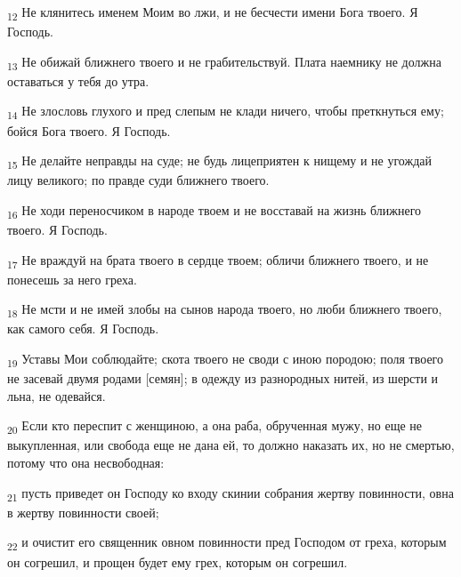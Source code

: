 \begin{tcolorbox}
\textsubscript{12} Не клянитесь именем Моим во лжи, и не бесчести имени Бога твоего. Я Господь.
\end{tcolorbox}
\begin{tcolorbox}
\textsubscript{13} Не обижай ближнего твоего и не грабительствуй. Плата наемнику не должна оставаться у тебя до утра.
\end{tcolorbox}
\begin{tcolorbox}
\textsubscript{14} Не злословь глухого и пред слепым не клади ничего, чтобы преткнуться ему; бойся Бога твоего. Я Господь.
\end{tcolorbox}
\begin{tcolorbox}
\textsubscript{15} Не делайте неправды на суде; не будь лицеприятен к нищему и не угождай лицу великого; по правде суди ближнего твоего.
\end{tcolorbox}
\begin{tcolorbox}
\textsubscript{16} Не ходи переносчиком в народе твоем и не восставай на жизнь ближнего твоего. Я Господь.
\end{tcolorbox}
\begin{tcolorbox}
\textsubscript{17} Не враждуй на брата твоего в сердце твоем; обличи ближнего твоего, и не понесешь за него греха.
\end{tcolorbox}
\begin{tcolorbox}
\textsubscript{18} Не мсти и не имей злобы на сынов народа твоего, но люби ближнего твоего, как самого себя. Я Господь.
\end{tcolorbox}
\begin{tcolorbox}
\textsubscript{19} Уставы Мои соблюдайте; скота твоего не своди с иною породою; поля твоего не засевай двумя родами [семян]; в одежду из разнородных нитей, из шерсти и льна, не одевайся.
\end{tcolorbox}
\begin{tcolorbox}
\textsubscript{20} Если кто переспит с женщиною, а она раба, обрученная мужу, но еще не выкупленная, или свобода еще не дана ей, то должно наказать их, но не смертью, потому что она несвободная:
\end{tcolorbox}
\begin{tcolorbox}
\textsubscript{21} пусть приведет он Господу ко входу скинии собрания жертву повинности, овна в жертву повинности своей;
\end{tcolorbox}
\begin{tcolorbox}
\textsubscript{22} и очистит его священник овном повинности пред Господом от греха, которым он согрешил, и прощен будет ему грех, которым он согрешил.
\end{tcolorbox}
